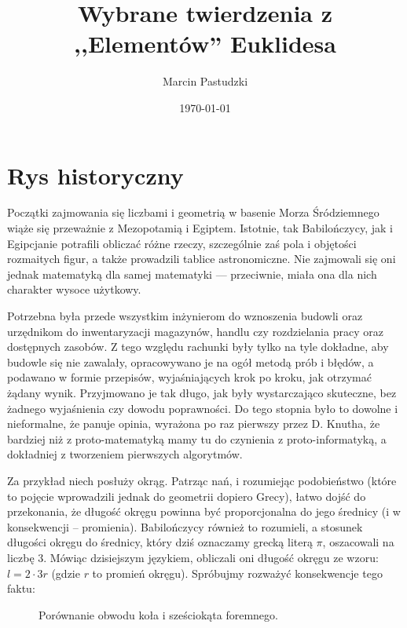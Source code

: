 \documentclass[12pt, a4paper]{article}
\title{Wybrane twierdzenia z ,,Elementów'' Euklidesa}
\author{Marcin Pastudzki}
\date{\today}
\begin{document}
\section*{Rys historyczny}

Początki zajmowania się liczbami i geometrią w basenie Morza Śródziemnego wiąże
się przeważnie z Mezopotamią i Egiptem. Istotnie, tak Babilończycy, jak i
Egipcjanie potrafili obliczać różne rzeczy, szczególnie zaś pola i objętości
rozmaitych figur, a także prowadzili tablice astronomiczne. Nie zajmowali się
oni jednak matematyką dla samej matematyki --- przeciwnie, miała ona dla nich
charakter wysoce użytkowy.

Potrzebna była przede wszystkim inżynierom do wznoszenia budowli oraz urzędnikom
do inwentaryzacji magazynów, handlu czy rozdzielania pracy oraz dostępnych
zasobów. Z tego względu rachunki były tylko na tyle dokładne, aby budowle się
nie zawalały, opracowywano je na ogół metodą prób i błędów, a podawano w
formie przepisów, wyjaśniających krok po kroku, jak otrzymać żądany wynik.
Przyjmowano je tak długo, jak były wystarczająco skuteczne, bez żadnego
wyjaśnienia czy dowodu poprawności. Do tego stopnia było to dowolne i
nieformalne, że panuje opinia, wyrażona po raz pierwszy przez D. Knutha, że
bardziej niż z proto-matematyką mamy tu do czynienia z proto-informatyką, a
dokładniej z tworzeniem pierwszych algorytmów.

Za przykład niech posłuży okrąg. Patrząc nań, i rozumiejąc podobieństwo (które
to pojęcie wprowadzili jednak do geometrii dopiero Grecy), łatwo dojść do
przekonania, że długość okręgu powinna być proporcjonalna do jego średnicy
(i w konsekwencji -- promienia). Babilończycy również to rozumieli, a stosunek
długości okręgu do średnicy, który dziś oznaczamy grecką literą $\pi$,
oszacowali na liczbę $3$. Mówiąc dzisiejszym językiem, obliczali oni długość
okręgu ze wzoru: $l = 2 \cdot 3r$ (gdzie $r$ to promień okręgu). Spróbujmy
rozważyć konsekwencje tego faktu:

\begin{figure}[h!]
    \begin{center}
      \caption{Porównanie obwodu koła i sześciokąta foremnego.}
  \end{center}
\end{figure}
\end{document}
